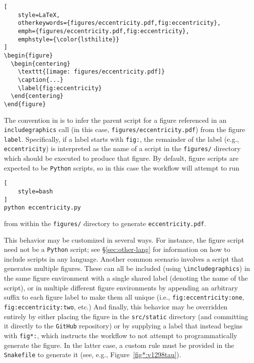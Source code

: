 \documentclass[twocolumn]{aastex631}
\begin{document}
\noindent\begin{minipage}{\linewidth}
\begin{lstlisting}[
    style=LaTeX,
    otherkeywords={figures/eccentricity.pdf,fig:eccentricity},
    emph={figures/eccentricity.pdf,fig:eccentricity},
    emphstyle={\color{lsthilite}}
]
\begin{figure}
  \begin{centering}
    \texttt{[image: figures/eccentricity.pdf]}
    \caption{...}
    \label{fig:eccentricity}
  \end{centering}
\end{figure}
\end{lstlisting}
\end{minipage}

\noindent The convention in \showyourwork is to infer the parent script for a figure referenced in an \texttt{includegraphics} call (in this case, {\color{lsthilite}\texttt{figures/eccentricity.pdf}}) from the figure \texttt{label}. 
Specifically, if a label starts with {\color{lsthilite}\texttt{fig:}}, the remainder of the label (e.g., {\color{lsthilite}\texttt{eccentricity}}) is interpreted as the name of a script in the \texttt{figures/} directory which should be executed to produce that figure. 
By default, figure scripts are expected to be \texttt{Python} scripts, so in this case the workflow will attempt to run\\

\noindent\begin{minipage}{\linewidth}
\begin{lstlisting}[
    style=bash
]
python eccentricity.py
\end{lstlisting}
\end{minipage}

\noindent from within the \texttt{figures/} directory to generate \texttt{eccentricity.pdf}.

This behavior may be customized in several ways. 
For instance, the figure script need not be a \texttt{Python} script; see \S\ref{sec:other-lang} for information on how to include scripts in any language.
Another common scenario involves a script that generates multiple figures. These can all be included (using \texttt{{\textbackslash}includegraphics}) in the same figure environment with a single shared label (denoting the name of the script), or in multiple different figure environments by appending an arbitrary suffix to each figure label to make them all unique (i.e., \texttt{fig:eccentricity:one}, \texttt{fig:eccentricity:two}, etc.)
And finally, this behavior may be overridden entirely by either placing the figure in the \texttt{src/static} directory (and committing it directly to the \texttt{GitHub} repository) or by supplying a label that instead begins with \texttt{fig*:}, which instructs the workflow to not attempt to programmatically generate the figure.
In the latter case, a custom rule must be provided in the \texttt{Snakefile} to generate it (see, e.g., Figure~\ref{fig*:v1298tau}).
\end{document}

